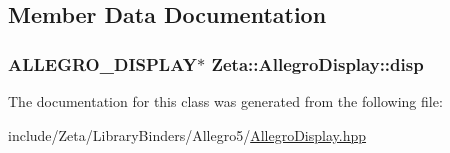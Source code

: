 \subsection{Member Data Documentation}
\hypertarget{classZeta_1_1AllegroDisplay_ae4e2198bfdb2680b78ae3ae1702f89ee}{
\subsubsection[{disp}]{\setlength{\rightskip}{0pt plus 5cm}A\+L\+L\+E\+G\+R\+O\+\_\+\+D\+I\+S\+P\+L\+A\+Y$\ast$ Zeta\+::\+Allegro\+Display\+::disp\hspace{0.3cm}{\ttfamily [private]}}}\label{classZeta_1_1AllegroDisplay_ae4e2198bfdb2680b78ae3ae1702f89ee}


The documentation for this class was generated from the following file\+:\begin{DoxyCompactItemize}
\item 
include/\+Zeta/\+Library\+Binders/\+Allegro5/\hyperlink{AllegroDisplay_8hpp}{Allegro\+Display.\+hpp}\end{DoxyCompactItemize}
